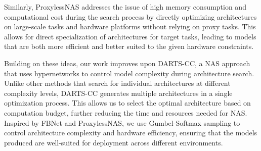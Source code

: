 \documentclass{article}
\begin{document}
Similarly, ProxylessNAS\cite{proxylessnas} addresses the issue of high memory consumption and computational cost during the search process by directly optimizing architectures on large-scale tasks and hardware platforms without relying on proxy tasks. This allows for direct specialization of architectures for target tasks, leading to models that are both more efficient and better suited to the given hardware constraints.

Building on these ideas, our work improves upon DARTS-CC\cite{yakovlev2021neural}, a NAS approach that uses hypernetworks to control model complexity during architecture search. Unlike other methods that search for individual architectures at different complexity levels, DARTS-CC generates multiple architectures in a single optimization process. This allows us to select the optimal architecture based on computation budget, further reducing the time and resources needed for NAS. Inspired by FBNet and ProxylessNAS, we use Gumbel-Softmax sampling to control architecture complexity and hardware efficiency, ensuring that the models produced are well-suited for deployment across different environments.






\end{document}
